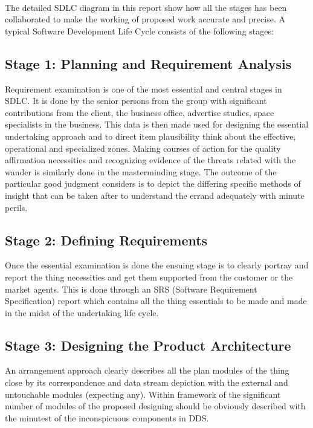 \documentclass{book}
\begin{document}
    	\paragraph{}
    	The detailed SDLC diagram in this report show how all the stages has been collaborated to make the working of proposed work accurate and precise. 
    	A typical Software Development Life Cycle consists of the following stages:
    	
    	 \subsection{Stage 1: Planning and Requirement Analysis}
    	Requirement examination is one of the most essential and central stages in SDLC. It is done by the senior persons from the group with significant contributions from the client, the business office, advertise studies, space specialists in the business. This data is then made used for designing the essential undertaking approach and to direct item plausibility think about the effective, operational and specialized zones. Making courses of action for the quality affirmation necessities and recognizing evidence of the threats related with the wander is similarly done in the masterminding stage. The outcome of the particular good judgment considers is to depict the differing specific methods of insight that can be taken after to understand the errand adequately with minute perils.
    	
    	\subsection{Stage 2: Defining Requirements}
    	Once the essential examination is done the ensuing stage is to clearly portray and report the thing necessities and get them supported from the customer or the market agents. This is done through an SRS (Software Requirement Specification) report which contains all the thing essentials to be made and made in the midst of the undertaking life cycle.
    	
    	\subsection{Stage 3: Designing the Product Architecture}
    	An arrangement approach clearly describes all the plan modules of the thing close by its correspondence and data stream depiction with the external and untouchable modules (expecting any). Within framework of the significant number of modules of the proposed designing should be obviously described with the minutest of the inconspicuous components in DDS.
    	
\end{document}
